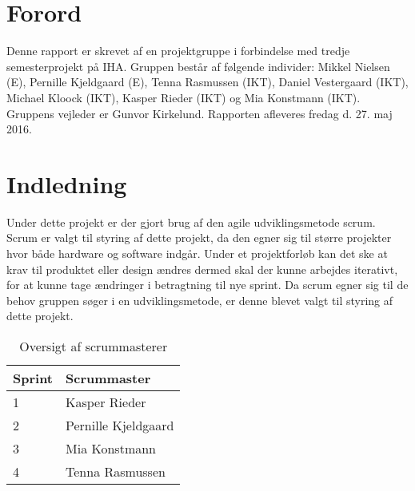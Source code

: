 \chapter{Forord}
Denne rapport er skrevet af en projektgruppe i forbindelse med tredje semesterprojekt på IHA. Gruppen består af følgende individer: Mikkel Nielsen (E), Pernille Kjeldgaard (E), Tenna Rasmussen (IKT), Daniel Vestergaard (IKT), Michael Kloock (IKT), Kasper Rieder (IKT) og Mia Konstmann (IKT). Gruppens vejleder er Gunvor Kirkelund. Rapporten afleveres fredag d. 27. maj 2016. 

\chapter{Indledning}
Under dette projekt er der gjort brug af den agile udviklingsmetode scrum. Scrum er valgt til styring af dette projekt, da den egner sig til større projekter hvor både hardware og software indgår. Under et projektforløb kan det ske at krav til produktet eller design ændres dermed skal der kunne arbejdes iterativt, for at kunne tage ændringer i betragtning til nye sprint. Da scrum egner sig til de behov gruppen søger i en udviklingsmetode, er denne blevet valgt til styring af dette projekt. 



\begin{table}[H]
	\centering
	\label{my-label}
	\begin{tabular}{|l|l|}
		\hline
		\textbf{Sprint} & \textbf{Scrummaster} \\ \hline
		1               & Kasper Rieder        \\ \hline
		2               & Pernille Kjeldgaard  \\ \hline
		3               & Mia Konstmann        \\ \hline
		4               & Tenna Rasmussen      \\ \hline
	\end{tabular}
	\caption{Oversigt af scrummasterer}
\end{table}

